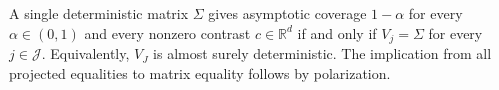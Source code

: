 A single deterministic matrix \(\Sigma\) gives asymptotic coverage \(1-\alpha\) for every \(\alpha\in(0,1)\) and every nonzero contrast \(c\in\mathbb R^d\) if and only if \(V_j=\Sigma\) for every \(j\in\mathcal J\). Equivalently, \(V_J\) is almost surely deterministic. The implication from all projected equalities to matrix equality follows by polarization.